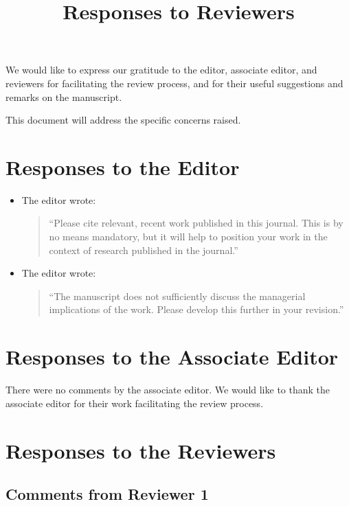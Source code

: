 \documentclass{article}
\title{Responses to Reviewers}
\author{}
\date{}
\begin{document}
\maketitle

We would like to express our gratitude to the editor, associate editor, and reviewers for facilitating the review process, and for their useful suggestions and remarks on the manuscript.

This document will address the specific concerns raised.

\section{Responses to the Editor}

\begin{itemize}

\item The editor wrote:
\begin{quote}
``Please cite relevant, recent work published in this journal. This is by no means mandatory, but it will help to position your work in the context of research published in the journal.''
\end{quote}


\item The editor wrote:
\begin{quote}
``The manuscript does not sufficiently discuss the managerial implications of the work. Please develop this further in your revision.''
\end{quote}

\end{itemize}


\section{Responses to the Associate Editor}
There were no comments by the associate editor. We would like to thank the associate editor for their work facilitating the review process.

\section{Responses to the Reviewers}

\subsection{Comments from Reviewer 1}
\end{document}
